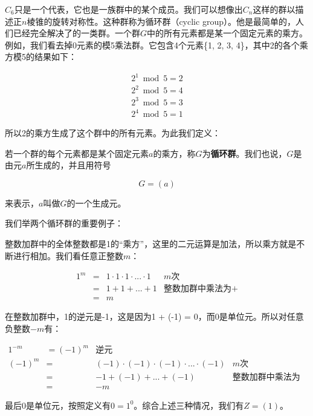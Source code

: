 \documentclass[b5paper]{ctexart}
\begin{document}
$C_6$只是一个代表，它也是一族群中的某个成员。我们可以想像出$C_n$这样的群以描述正$n$棱锥的旋转对称性。这种群称为循环群（cyclic group）。他是最简单的，人们已经完全解决了的一类群。一个群$G$中的所有元素都是某一个固定元素的乘方。例如，我们看去掉0元素的模5乘法群。它包含4个元素\{1, 2, 3, 4\}，其中2的各个乘方模5的结果如下：

\[
\begin{array}{l}
2^1 \bmod 5 = 2 \\
2^2 \bmod 5 = 4 \\
2^3 \bmod 5 = 3 \\
2^4 \bmod 5 = 1
\end{array}
\]

所以2的乘方生成了这个群中的所有元素。为此我们定义：

\begin{definition}
若一个群的每个元素都是某个固定元素$a$的乘方，称$G$为\textbf{循环群}。我们也说，$G$是由元$a$所生成的，并且用符号

\[
G = (a)
\]

来表示，$a$叫做$G$的一个生成元。
\end{definition}

我们举两个循环群的重要例子：

\begin{example}
整数加群中的全体整数都是1的“乘方”，这里的二元运算是加法，所以乘方就是不断进行相加。我们看任意正整数$m$：

\[
\begin{array}{rcll}
1^m & = & 1 \cdot 1 \cdot 1 \cdot ... \cdot 1 & \text{$m$次} \\
    & = & 1 + 1 + ... + 1 & \text{整数加群中乘法为+} \\
    & = & m &
\end{array}
\]

在整数加群中，1的逆元是-1，这是因为1 + (-1) = 0，而0是单位元。所以对任意负整数$-m$有：

\[
\begin{array}{rcll}
1^{-m} & = (-1)^m & \text{逆元} & \\
(-1)^m & = & (-1) \cdot (-1) \cdot (-1) \cdot ... \cdot (-1) & \text{$m$次} \\
       & = & -1 + (-1) + ... + (-1) & \text{整数加群中乘法为+} \\
       & = & -m &
\end{array}
\]

最后0是单位元，按照定义有$0 = 1^0$。综合上述三种情况，我们有$Z = (1)$。
\end{example}
\end{document}
